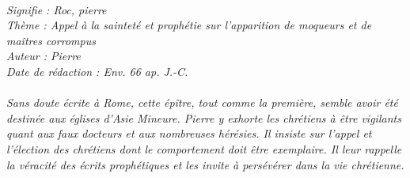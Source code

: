 \BFont
\noindent\hrulefill
{\footnotesize
\textit{
\bigskip
{\centering{}
\\Signifie : Roc, pierre
\\Thème : Appel à la sainteté et prophétie sur l'apparition de moqueurs et de maîtres corrompus
\\Auteur : Pierre
\\Date de rédaction : Env. 66 ap. J.-C.\\}
}
\textit{
\\Sans doute écrite à Rome, cette épître, tout comme la première, semble avoir été destinée aux églises d’Asie Mineure. Pierre y exhorte les chrétiens à être vigilants quant aux faux docteurs et aux nombreuses hérésies. Il insiste sur l’appel et l’élection des chrétiens dont le comportement doit être exemplaire. Il leur rappelle la véracité des écrits prophétiques et les invite à persévérer dans la vie chrétienne.\bigskip
}
}
\par\nobreak\noindent\hrulefill
